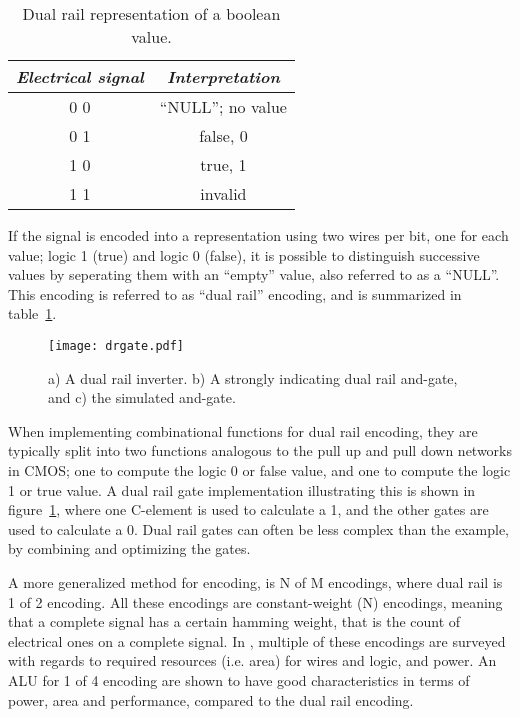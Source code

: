 \begin{table}
  \centering
  \begin{tabular}{|c|c|}
    \hline
    \emph{Electrical signal} & \emph{Interpretation} \\
    \hline
    0 0 & ``NULL''; no value \\
    0 1 & false, 0 \\
    1 0 & true, 1 \\
    1 1 & invalid \\
    \hline
  \end{tabular}
  \label{tab:dr}
  \caption{Dual rail representation of a boolean value.}
\end{table}

If the signal is encoded into a representation using two wires per
bit, one for each value; logic 1 (true) and logic 0 (false), it is
possible to distinguish successive values by seperating them with an
``empty'' value, also referred to as a ``NULL''. This encoding is
referred to as ``dual rail'' encoding, and is summarized in
table~\ref{tab:dr}.

\begin{figure}[htbp]
  \centering
  \texttt{[image: drgate.pdf]}
  \caption{a) A dual rail inverter. b) A strongly indicating dual rail
    and-gate, and c) the simulated and-gate.}
  \label{fig:drgate}
\end{figure}

When implementing combinational functions for dual rail encoding, they
are typically split into two functions analogous to the pull up and
pull down networks in CMOS; one to compute the logic 0 or false value,
and one to compute the logic 1 or true value. A dual rail gate
implementation illustrating this is shown in figure~\ref{fig:drgate},
where one C-element is used to calculate a 1, and the other gates are
used to calculate a 0. Dual rail gates can often be less complex than
the example, by combining and optimizing the gates.

A more generalized method for encoding, is N of M encodings, where
dual rail is 1 of 2 encoding. All these encodings are constant-weight
(N) encodings, meaning that a complete signal has a certain hamming
weight, that is the count of electrical ones on a complete signal. In
\cite[chapter 9]{nullconv}, multiple of these encodings are surveyed
with regards to required resources (i.e. area) for wires and logic,
and power. An ALU for 1 of 4 encoding are shown to have good
characteristics in terms of power, area and performance, compared to
the dual rail encoding.

